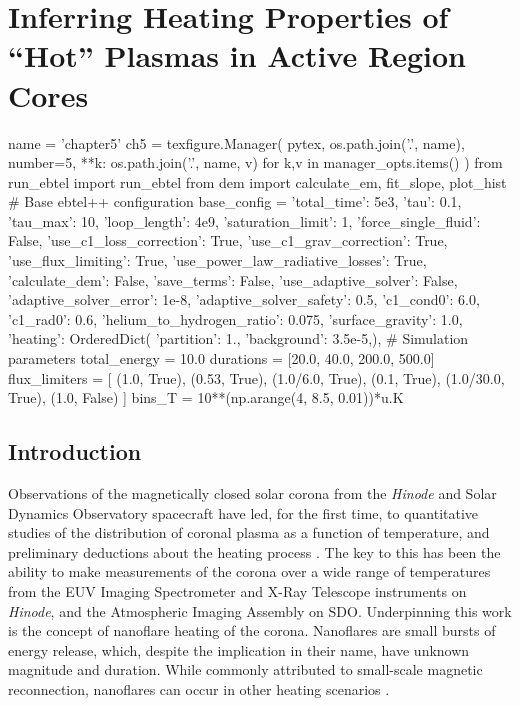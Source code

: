 \chapter{Inferring Heating Properties of ``Hot'' Plasmas in Active Region Cores}\label{ch:inferring_hot_plasma}

\begin{pycode}[chapter5]
name = 'chapter5'
ch5 = texfigure.Manager(
    pytex,
    os.path.join('.', name),
    number=5,
    **{k: os.path.join('.', name, v) for k,v in manager_opts.items()}
)
from run_ebtel import run_ebtel
from dem import calculate_em, fit_slope, plot_hist
# Base ebtel++ configuration
base_config = {
    'total_time': 5e3,
    'tau': 0.1,
    'tau_max': 10,
    'loop_length': 4e9,
    'saturation_limit': 1,
    'force_single_fluid': False,
    'use_c1_loss_correction': True,
    'use_c1_grav_correction': True,
    'use_flux_limiting': True,
    'use_power_law_radiative_losses': True,
    'calculate_dem': False,
    'save_terms': False,
    'use_adaptive_solver': False,
    'adaptive_solver_error': 1e-8,
    'adaptive_solver_safety': 0.5,
    'c1_cond0': 6.0,
    'c1_rad0': 0.6,
    'helium_to_hydrogen_ratio': 0.075,
    'surface_gravity': 1.0,
    'heating': OrderedDict({
        'partition': 1.,
        'background': 3.5e-5,}),
}
# Simulation parameters
total_energy = 10.0
durations = [20.0, 40.0, 200.0, 500.0]
flux_limiters = [
    (1.0, True),
    (0.53, True),
    (1.0/6.0, True),
    (0.1, True),
    (1.0/30.0, True),
    (1.0, False)
]
bins_T = 10**(np.arange(4, 8.5, 0.01))*u.K
\end{pycode}


\section{Introduction}\label{hot-plasma:sec:intro}

Observations of the magnetically closed solar corona from the \textit{Hinode} \citep{kosugi_hinode_2007} and Solar Dynamics Observatory \citep[SDO,][]{pesnell_solar_2012} spacecraft have led, for the first time, to quantitative studies of the distribution of coronal plasma as a function of temperature, and preliminary deductions about the heating process \citep[see papers in][]{de_moortel_recent_2015}. The key to this has been the ability to make measurements of the corona over a wide range of temperatures from the EUV Imaging Spectrometer \citep[EIS,][]{culhane_euv_2007} and X-Ray Telescope \citep[XRT,][]{golub_x-ray_2007} instruments on \textit{Hinode}, and the Atmospheric Imaging Assembly \citep[AIA,][]{lemen_atmospheric_2012} on SDO. Underpinning this work is the concept of nanoflare heating of the corona. Nanoflares \citep[e.g.][]{parker_nanoflares_1988} are small bursts of energy release, which, despite the implication in their name, have unknown magnitude and duration. While commonly attributed to small-scale magnetic reconnection, nanoflares can occur in other heating scenarios \citep[e.g.][]{ofman_self-consistent_1998}.

